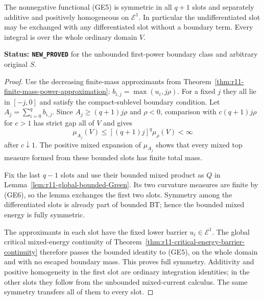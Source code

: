 \begin{theorem}
\label{thm:r11-global-first-mixed-symmetry}
The nonnegative functional (GE5) is symmetric in all $q+1$
slots and separately additive and positively homogeneous on
$\mathcal E^1$. In particular the undifferentiated slot may
be exchanged with any differentiated slot without a boundary
term. Every integral is over the whole ordinary domain $V$.
\end{theorem}

\noindent\textbf{Status: \texttt{NEW\_PROVED}} for the
unbounded first-power boundary class and arbitrary original $S$.

\begin{proof}
Use the decreasing finite-mass approximants from
Theorem~\ref{thm:r11-finite-mass-power-approximation}:
$b_{i,j}=\max(u_i,j\rho)$. For a fixed $j$ they all lie
in $[-j,0]$ and satisfy the compact-sublevel boundary condition.
Let $A_j=\sum_{i=0}^q b_{i,j}$. Since
$A_j\geq(q+1)j\rho$ and $\rho<0$, comparison with
$c(q+1)j\rho$ for $c>1$ has strict gap all of $V$ and gives
\[
          \mu_{A_j}(V)
              \leq[(q+1)j]^q\mu_\rho(V)<\infty
 \tag{GE6}
\]
after $c\downarrow1$. The positive mixed expansion of
$\mu_{A_j}$ shows that every mixed top measure formed from
these bounded slots has finite total mass.

Fix the last $q-1$ slots and use their bounded mixed product
as $Q$ in Lemma~\ref{lem:r11-global-bounded-Green}. Its two
curvature measures are finite by (GE6), so the lemma exchanges
the first two slots. Symmetry among the differentiated slots
is already part of bounded BT; hence the bounded mixed energy
is fully symmetric.

The approximants in each slot have the fixed lower barrier
$u_i\in\mathcal E^1$. The global critical mixed-energy
continuity of Theorem~\ref{thm:r11-critical-energy-barrier-continuity}
therefore passes the bounded identity to (GE5), on the whole
domain and with no escaped boundary mass. This proves full
symmetry. Additivity and positive homogeneity in the first
slot are ordinary integration identities; in the other slots
they follow from the unbounded mixed-current calculus. The
same symmetry transfers all of them to every slot.
\end{proof}

